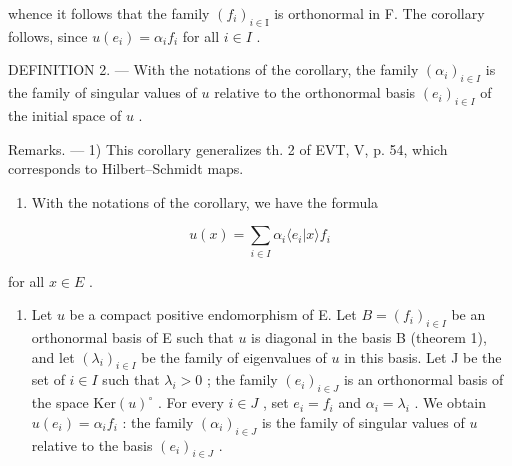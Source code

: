 whence it follows that the family \((f_{i})_{i\in\mathrm{I}}\) is orthonormal in F. The corollary follows, since \(u(e_{i})=\alpha_{i}f_{i}\) for all \(i\in I\) .

DEFINITION 2. --- With the notations of the corollary, the family \((\alpha_{i})_{i\in I}\) is the family of singular values of \(u\) relative to the orthonormal basis \((e_{i})_{i\in I}\) of the initial space of \(u\) .

Remarks. --- 1) This corollary generalizes th. 2 of EVT, V, p. 54, which corresponds to Hilbert--Schmidt maps.

\begin{enumerate}
\def\labelenumi{\arabic{enumi})}
\setcounter{enumi}{1}
\tightlist
\item
  With the notations of the corollary, we have the formula
\end{enumerate}

\[
u (x) = \sum_ {i \in I} \alpha_ {i} \langle e _ {i} | x \rangle f _ {i}\tag{1}
\]

for all \(x \in E\) .

\begin{enumerate}
\def\labelenumi{\arabic{enumi})}
\setcounter{enumi}{2}
\tightlist
\item
  Let \(u\) be a compact positive endomorphism of E. Let \(B = (f_i)_{i \in I}\) be an orthonormal basis of E such that \(u\) is diagonal in the basis B (theorem 1), and let \((\lambda_i)_{i \in I}\) be the family of eigenvalues of \(u\) in this basis. Let J be the set of \(i \in I\) such that \(\lambda_i > 0\) ; the family \((e_i)_{i \in J}\) is an orthonormal basis of the space \(\text{Ker}(u)^{\circ}\) . For every \(i \in J\) , set \(e_i = f_i\) and \(\alpha_i = \lambda_i\) . We obtain \(u(e_i) = \alpha_if_i\) : the family \((\alpha_i)_{i \in J}\) is the family of singular values of \(u\) relative to the basis \((e_i)_{i \in J}\) .
\end{enumerate}

